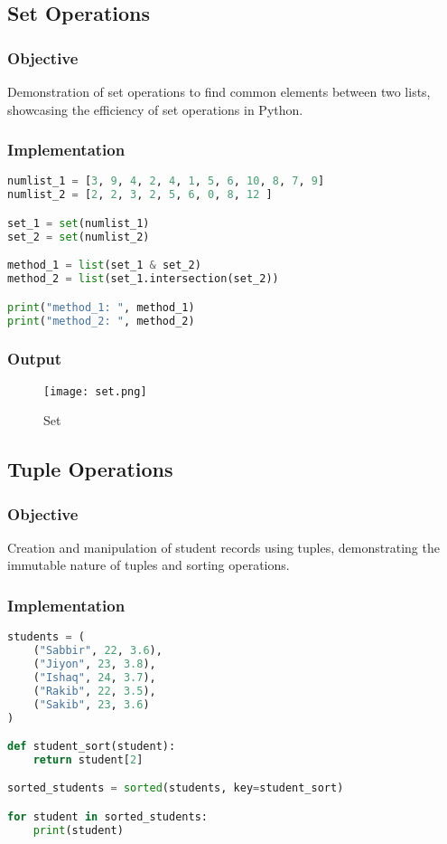 \documentclass[12pt]{article}
\begin{document}
\subsection{Set Operations\hfill\href{https://github.com/sabbirahmed404/Python-Practice/blob/main/set.py}{\faGithub}}
\subsubsection{Objective}
Demonstration of set operations to find common elements between two lists, showcasing the efficiency of set operations in Python.

\subsubsection{Implementation}
\begin{lstlisting}[language=Python, caption=Set Operations Implementation]
numlist_1 = [3, 9, 4, 2, 4, 1, 5, 6, 10, 8, 7, 9]
numlist_2 = [2, 2, 3, 2, 5, 6, 0, 8, 12 ]

set_1 = set(numlist_1)
set_2 = set(numlist_2)

method_1 = list(set_1 & set_2)
method_2 = list(set_1.intersection(set_2))

print("method_1: ", method_1)
print("method_2: ", method_2)
\end{lstlisting}

\subsubsection{Output}
\begin{figure}[h]
    \centering
    \texttt{[image: set.png]}
    \caption{Set}
    \label{fig:enter-label}
\end{figure}

\subsection{Tuple Operations\hfill\href{https://github.com/sabbirahmed404/Python-Practice/blob/main/tuple.py}{\faGithub}}
\subsubsection{Objective}
Creation and manipulation of student records using tuples, demonstrating the immutable nature of tuples and sorting operations.

\subsubsection{Implementation}
\begin{lstlisting}[language=Python, caption=Tuple Operations Implementation]
students = (
    ("Sabbir", 22, 3.6),
    ("Jiyon", 23, 3.8),
    ("Ishaq", 24, 3.7),
    ("Rakib", 22, 3.5),
    ("Sakib", 23, 3.6)
)

def student_sort(student):
    return student[2]

sorted_students = sorted(students, key=student_sort)

for student in sorted_students:
    print(student)

\end{lstlisting}
\end{document}
